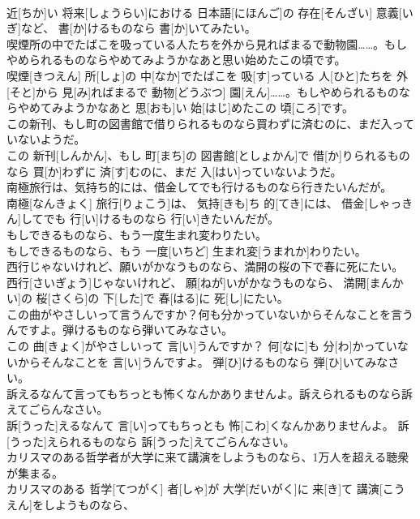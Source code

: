 \documentclass[8pt]{extreport}
\begin{document}
\begin{CJK}{UTF8}{min}
\\	近[ちか]い 将来[しょうらい]における 日本語[にほんご]の 存在[そんざい] 意義[いぎ]など、 書[か]けるものなら 書[か]いてみたい。
\\	喫煙所の中でたばこを吸っている人たちを外から見ればまるで動物園……。もしやめられるものならやめてみようかなあと思い始めたこの頃です。	
\\	喫煙[きつえん] 所[しょ]の 中[なか]でたばこを 吸[す]っている 人[ひと]たちを 外[そと]から 見[み]ればまるで 動物[どうぶつ] 園[えん]……。もしやめられるものならやめてみようかなあと 思[おも]い 始[はじ]めたこの 頃[ころ]です。
\\	この新刊、もし町の図書館で借りられるものなら買わずに済むのに、まだ入っていないようだ。	
\\	この 新刊[しんかん]、もし 町[まち]の 図書館[としょかん]で 借[か]りられるものなら 買[か]わずに 済[す]むのに、まだ 入[はい]っていないようだ。
\\	南極旅行は、気持ち的には、借金してでも行けるものなら行きたいんだが。	
\\	南極[なんきょく] 旅行[りょこう]は、 気持[きも]ち 的[てき]には、 借金[しゃっきん]してでも 行[い]けるものなら 行[い]きたいんだが。
\\	もしできるものなら、もう一度生まれ変わりたい。	
\\	もしできるものなら、もう 一度[いちど] 生まれ変[うまれか]わりたい。
\\	西行じゃないけれど、願いがかなうものなら、満開の桜の下で春に死にたい。	
\\	西行[さいぎょう]じゃないけれど、 願[ねが]いがかなうものなら、 満開[まんかい]の 桜[さくら]の 下[した]で 春[はる]に 死[し]にたい。
\\	この曲がやさしいって言うんですか？何も分かっていないからそんなことを言うんですよ。弾けるものなら弾いてみなさい。	
\\	この 曲[きょく]がやさしいって 言[い]うんですか？ 何[なに]も 分[わ]かっていないからそんなことを 言[い]うんですよ。 弾[ひ]けるものなら 弾[ひ]いてみなさい。
\\	訴えるなんて言ってもちっとも怖くなんかありませんよ。訴えられるものなら訴えてごらんなさい。	
\\	訴[うった]えるなんて 言[い]ってもちっとも 怖[こわ]くなんかありませんよ。 訴[うった]えられるものなら 訴[うった]えてごらんなさい。
\\	カリスマのある哲学者が大学に来て講演をしようものなら、1万人を超える聴衆が集まる。	
\\	カリスマのある 哲学[てつがく] 者[しゃ]が 大学[だいがく]に 来[き]て 講演[こうえん]をしようものなら、 

\end{CJK}
\end{document}
